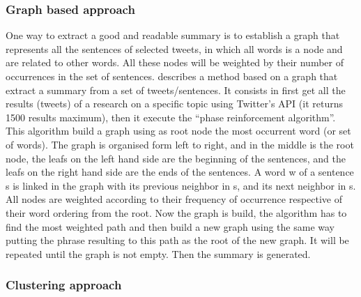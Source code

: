 \documentclass[a4paper, twocolumn]{article}
\begin{document}
\subsubsection{Graph based approach}

One way to extract a good and readable summary is to establish a graph that
represents all the sentences of selected tweets, in which all words is a node
and are related to other words. All these nodes will be weighted by their
number of occurrences in the set of sentences.
\textcite{sharifi_summarizing_2010} describes a method based on a graph that
extract a summary from a set of tweets/sentences. It consists in first get all
the results (tweets) of a research on a specific topic using Twitter’s API (it
returns 1500 results maximum), then it execute the “phase reinforcement
algorithm”. This algorithm build a graph using as root node the most occurrent
word (or set of words). The graph is organised form left to right, and in the
middle is the root node, the leafs on the left hand side are the beginning of
the sentences, and the leafs on the right hand side are the ends of the
sentences. A word w of a sentence s is linked in the graph with its previous
neighbor in s, and its next neighbor in s. All nodes are weighted according to
their frequency of occurrence respective of their word ordering from the root.
Now the graph is build, the algorithm has to find the most weighted path and
then build a new graph using the same way putting the phrase resulting to this
path as the root of the new graph. It will be repeated until the graph is not
empty. Then the summary is generated.

\subsubsection{Clustering approach}
\end{document}
